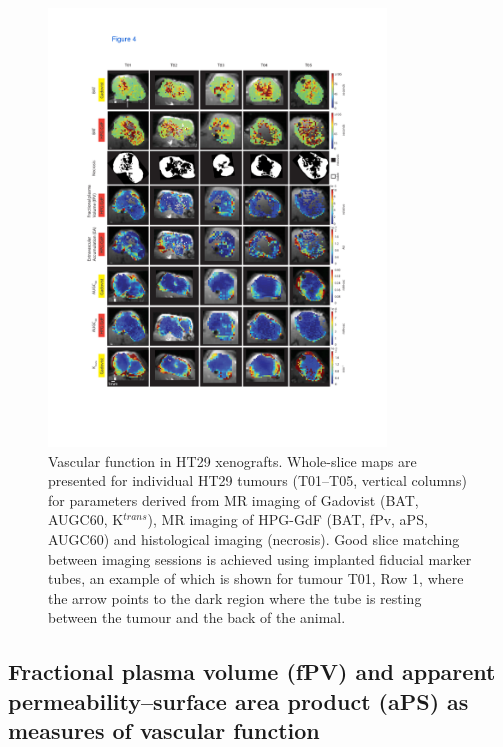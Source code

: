 \begin{figure}[htbp]   
 \begin{center}  
 \includegraphics[width=0.8\textwidth]{hpg/hpg-images/hpg_fig4-ht29.pdf}
 \caption{Vascular function in HT29 xenografts. Whole-slice maps are presented for individual HT29 tumours (T01–T05, vertical columns) for parameters derived from MR imaging of Gadovist (BAT, AUGC60, K$^{trans}$), MR imaging of HPG-GdF (BAT, fPv, aPS, AUGC60) and histological imaging (necrosis). Good slice matching between imaging sessions is achieved using implanted fiducial marker tubes, an example of which is shown for tumour T01, Row 1, where the arrow points to the dark region where the tube is resting between the tumour and the back of the animal.}  
 \label{hpgpaper:fig4}  
 \end{center}
\end{figure}

\subsection{Fractional plasma volume (fPV) and apparent permeability–surface area product (aPS) as measures of vascular function}

